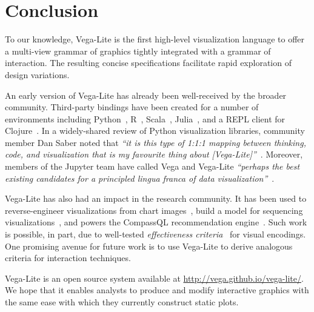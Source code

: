 
\vspace{-10pt}

\section{Conclusion}
\label{sec:vl:conclusion}

\vspace{-10pt}

To our knowledge, Vega-Lite is the first high-level visualization language to
offer a multi-view grammar of graphics tightly integrated with a grammar of
interaction. The resulting concise specifications facilitate rapid exploration
of design variations.

An early version of Vega-Lite has already been well-received by the broader
community. Third-party bindings have been created for a number of environments
including Python~\cite{vega-lite:altair}, R~\cite{vega-lite:hrbrmstr,
vega-lite:timelyportfolio}, Scala~\cite{vega-lite:scala},
Julia~\cite{vega-lite:julia}, and a REPL client for
Clojure~\cite{vega-lite:clojure}. In a widely-shared review of Python
visualization libraries, community member Dan Saber noted that \emph{``it is
this type of 1:1:1 mapping between thinking, code, and visualization that is my
favourite thing about [Vega-Lite]''}~\cite{saber:dramatictour}. Moreover,
members of the Jupyter team have called Vega and Vega-Lite \emph{``perhaps the
best existing candidates for a principled \emph{lingua franca} of data
visualization''}~\cite{vega-lite:altair}.

Vega-Lite has also had an impact in the research community. It has been used to
reverse-engineer visualizations from chart images~\cite{poco:reverse}, build a
model for sequencing visualizations~\cite{kim:graphscape}, and powers the
CompassQL recommendation engine~\cite{voyager,voyager2,compassql}. Such work is
possible, in part, due to well-tested \emph{effectiveness
criteria}~\cite{bertin:semiology, cleveland:perception, mackinlay:apt} for
visual encodings. One promising avenue for future work is to use Vega-Lite to
derive analogous criteria for interaction techniques.

Vega-Lite is an open source system available at
\url{http://vega.github.io/vega-lite/}. We hope that it enables analysts to
produce and modify interactive graphics with the same ease with which they
currently construct static plots.